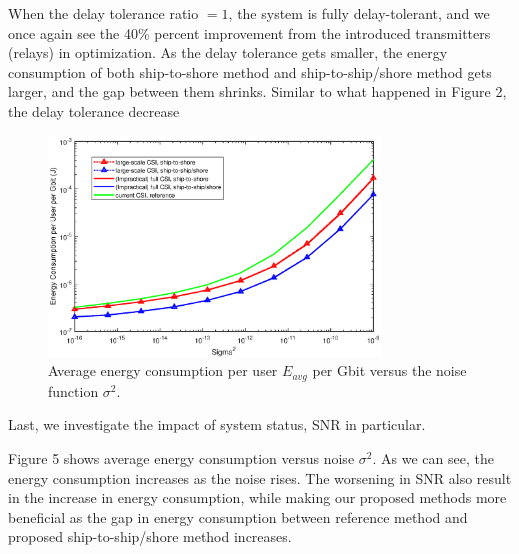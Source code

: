 \documentclass[conference]{IEEEtran}
\begin{document}
When the delay tolerance ratio $= 1$, the system is fully delay-tolerant, and we once again see the 40\% percent improvement from the introduced transmitters (relays) in optimization. As the delay tolerance gets smaller, the energy consumption of both ship-to-shore method and ship-to-ship/shore method gets larger, and the gap between them shrinks. Similar to what happened in Figure 2, the delay tolerance decrease %

\begin{figure} [htb]
\begin{center}
\includegraphics*[width=8.8cm]{sigma2s.eps}
\end{center}
\vspace*{-4mm} 
\caption{Average energy consumption per user $E_{avg}$ per Gbit versus the noise function ${\sigma ^2}$.}\label{fig:5}
\vspace*{-2mm} 
\end{figure}

Last, we investigate the impact of system status, SNR in particular.

Figure 5 shows average energy consumption versus noise ${\sigma ^2}$. As we can see, the energy consumption increases as the noise rises. %
The worsening in SNR also result in the increase in energy consumption, while making our proposed methods more beneficial as the gap in energy consumption between reference method and proposed ship-to-ship/shore method increases. %
\end{document}
